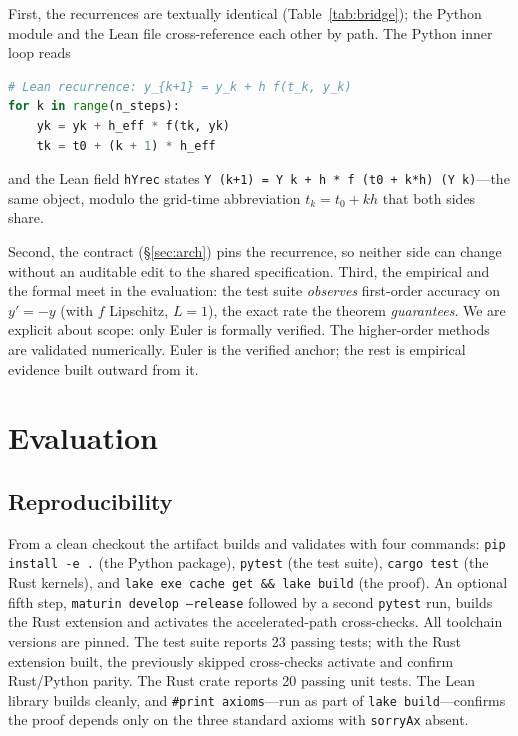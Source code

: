 \documentclass[sigplan,nonacm,screen,review]{acmart}
\begin{document}
First, the recurrences are textually identical (Table~\ref{tab:bridge}); the
Python module and the Lean file cross-reference each other by path. The Python
inner loop reads
\begin{lstlisting}[language=Python]
# Lean recurrence: y_{k+1} = y_k + h f(t_k, y_k)
for k in range(n_steps):
    yk = yk + h_eff * f(tk, yk)
    tk = t0 + (k + 1) * h_eff
\end{lstlisting}
and the Lean field \texttt{hYrec} states
\lstinline[language=lean]|Y (k+1) = Y k + h * f (t0 + k*h) (Y k)|---the same
object, modulo the grid-time abbreviation $t_k = t_0 + kh$ that both sides share.

Second, the contract (\S\ref{sec:arch}) pins the recurrence, so neither side can
change without an auditable edit to the shared specification. Third, the empirical
and the formal meet in the evaluation: the test suite \emph{observes} first-order
accuracy on $y' = -y$ (with $f$ Lipschitz, $L=1$), the exact rate the theorem
\emph{guarantees}. We are explicit about scope: only Euler is formally verified.
The higher-order methods are validated numerically. Euler is the verified anchor;
the rest is empirical evidence built outward from it.

\section{Evaluation}
\label{sec:eval}

\subsection{Reproducibility}
From a clean checkout the artifact builds and validates with four commands:
\texttt{pip install -e .} (the Python package), \texttt{pytest} (the test suite),
\texttt{cargo test} (the Rust kernels), and
\texttt{lake exe cache get \&\& lake build} (the proof). An optional fifth step,
\texttt{maturin develop --release} followed by a second \texttt{pytest} run,
builds the Rust extension and activates the accelerated-path cross-checks. All
toolchain versions are pinned. The test suite reports 23 passing tests; with the
Rust extension built, the previously skipped cross-checks activate and confirm
Rust/Python parity. The Rust crate reports 20 passing unit tests. The Lean
library builds cleanly, and \texttt{\#print axioms}---run as part of
\texttt{lake build}---confirms the proof depends only on the three standard
axioms with \texttt{sorryAx} absent.
\end{document}
